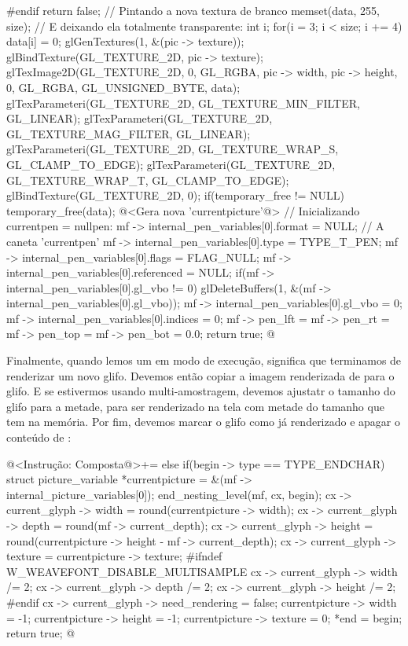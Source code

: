 {{{{{{{{{#endif
      return false;
    }
    // Pintando a nova textura de branco
    memset(data, 255, size);
    { // E deixando ela totalmente transparente:
      int i;
      for(i = 3; i < size; i += 4)
        data[i] = 0;
    }
    glGenTextures(1, &(pic -> texture));
    glBindTexture(GL_TEXTURE_2D, pic -> texture);
    glTexImage2D(GL_TEXTURE_2D, 0, GL_RGBA, pic -> width, pic -> height, 0,
                 GL_RGBA, GL_UNSIGNED_BYTE, data);
    glTexParameteri(GL_TEXTURE_2D, GL_TEXTURE_MIN_FILTER, GL_LINEAR);
    glTexParameteri(GL_TEXTURE_2D, GL_TEXTURE_MAG_FILTER, GL_LINEAR);
    glTexParameteri(GL_TEXTURE_2D, GL_TEXTURE_WRAP_S, GL_CLAMP_TO_EDGE);
    glTexParameteri(GL_TEXTURE_2D, GL_TEXTURE_WRAP_T, GL_CLAMP_TO_EDGE);
    glBindTexture(GL_TEXTURE_2D, 0);
    if(temporary_free != NULL)
      temporary_free(data);
    @<Gera nova 'currentpicture'@>
  }
  { // Inicializando currentpen = nullpen:
    mf -> internal_pen_variables[0].format = NULL; // A caneta 'currentpen'
    mf -> internal_pen_variables[0].type = TYPE_T_PEN;
    mf -> internal_pen_variables[0].flags = FLAG_NULL;
    mf -> internal_pen_variables[0].referenced = NULL;
    if(mf -> internal_pen_variables[0].gl_vbo != 0)
      glDeleteBuffers(1, &(mf -> internal_pen_variables[0].gl_vbo));
    mf -> internal_pen_variables[0].gl_vbo = 0;
    mf -> internal_pen_variables[0].indices = 0;
    mf -> pen_lft = mf -> pen_rt = mf -> pen_top = mf -> pen_bot = 0.0;
  }
  return true;
}
@
\fimcodigo

Finalmente, quando lemos um  em modo de execução,
significa que terminamos de renderizar um novo glifo. Devemos então
copiar a imagem renderizada de  para o
glifo. E se estivermos usando multi-amostragem, devemos ajustatr o
tamanho do glifo para a metade, para ser renderizado na tela com
metade do tamanho que tem na memória. Por fim, devemos marcar o glifo
como já renderizado e apagar o conteúdo
de :

\iniciocodigo
@<Instrução: Composta@>+=
else if(begin -> type == TYPE_ENDCHAR){
  struct picture_variable *currentpicture =
                                        &(mf -> internal_picture_variables[0]);
  end_nesting_level(mf, cx, begin);
  cx -> current_glyph -> width = round(currentpicture -> width);
  cx -> current_glyph -> depth = round(mf -> current_depth);
  cx -> current_glyph -> height = round(currentpicture -> height -
                                        mf -> current_depth);
  cx -> current_glyph -> texture = currentpicture -> texture;
#ifndef W_WEAVEFONT_DISABLE_MULTISAMPLE
  cx -> current_glyph -> width /= 2;
  cx -> current_glyph -> depth /= 2;
  cx -> current_glyph -> height /= 2;
#endif
  cx -> current_glyph -> need_rendering = false;
  currentpicture -> width = -1;
  currentpicture -> height = -1;
  currentpicture -> texture = 0;
  *end = begin;
  return true;
}
@
\fimcodigo

}}}}}}
